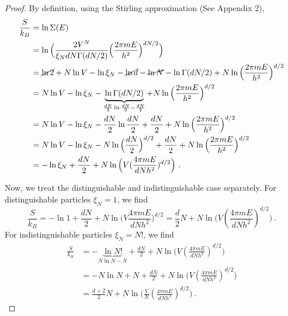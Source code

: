     \begin{proof}
        By definition, using the Stirling approximation (See Appendix 2),
        \begin{equation*}
        \begin{aligned}
            \frac{S}{k_B} & = \ln \Sigma (E) \\ & = \ln \Big ( \frac{2V^{N}}{\xi_N d N \Gamma(dN/2)} \Big ( \frac{2 \pi m E}{h^2}\Big)^{dN/2} \Big ) \\ & = \cancel{\ln 2} + N \ln V - \ln \xi_N - \cancel{\ln d} - \cancel{\ln N} - \ln \Gamma (dN/2) + N \ln \Big (\frac{2 \pi m E}{h^2} \Big )^{d/2} \\ & =  N \ln V - \ln \xi_N - \underbrace{\ln \Gamma (dN/2)}_{\frac{dN}{2} \ln \frac{dN}{2} - \frac{dN}{2}} + N \ln \Big (\frac{2 \pi m E}{h^2} \Big )^{d/2} \\ & = N \ln V - \ln \xi_N - \frac{dN}{2} \ln \frac{dN}{2} + \frac{dN}{2} + N \ln \Big (\frac{2 \pi m E}{h^2} \Big )^{d/2} \\ & = N \ln V - \ln \xi_N - N \ln \Big(\frac{dN}{2} \Big)^{d/2} + \frac{dN}{2} + N \ln \Big (\frac{2 \pi m E}{h^2} \Big )^{d/2} \\ & = - \ln \xi_N + \frac{dN}{2} + N \ln \Big ( V (\frac{4 \pi m E}{d N h^2})^{d/2} \Big) ~.
        \end{aligned}
        \end{equation*}

        Now, we treat the distinguishable and indistinguishable case separately. For distinguishable particles $\xi_N = 1$, we find
        \begin{equation*}
            \frac{S}{k_B} = - \ln 1 + \frac{dN}{2} + N \ln \Big (V \frac{4 \pi m E}{dNh^2} \Big )^{d/2} = \frac{d}{2} N + N \ln \Big ( V (\frac{4 \pi m E}{d N h^2})^{d/2} \Big) ~.
        \end{equation*}
        For indistinguishable particles $\xi_N = N!$, we find
        \begin{equation*}
        \begin{aligned}
            \frac{S}{k_B} & = - \underbrace{\ln N!}_{N \ln N - N} + \frac{dN}{2} + N \ln \Big ( V (\frac{4 \pi m E}{d N h^2})^{d/2} \Big) \\ & = - N \ln N + N + \frac{dN}{2} + N \ln \Big ( V (\frac{4 \pi m E}{d N h^2})^{d/2} \Big) \\ & = \frac{d + 2}{2} N + N \ln \Big ( \frac{V}{N} (\frac{4 \pi m E}{d N h^2})^{d/2} \Big) ~.
        \end{aligned}
        \end{equation*}
    \end{proof}

